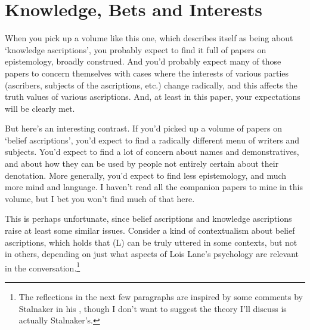 \providecommand{\objrep}[2]{
\bigskip
\noindent \textit{Objection}: #1

\medskip
\noindent \textit{Reply}: #2

}

\providecommand{\argconc}{
\renewcommand{\labelenumi}{\Alph{enumi}.}
\setcounter{enumi}{2}
}

\providecommand{\numbex}[2]{
\begin{enumerate}
\setcounter{enumi}{\value{paper}}
\renewcommand{\labelenumi}{(\arabic{enumi})}
#2
\end{enumerate}
\addtocounter{paper}{#1}}

\chapter[Knowledge, Bets and Interests]{Knowledge, Bets and Interests}


When you pick up a volume like this one, which describes itself as being about `knowledge ascriptions', you probably expect to find it full of papers on epistemology, broadly construed. And you'd probably expect many of those papers to concern themselves with cases where the interests of various parties (ascribers, subjects of the ascriptions, etc.) change radically, and this affects the truth values of various ascriptions. And, at least in this paper, your expectations will be clearly met.

But here's an interesting contrast. If you'd picked up a volume of papers on `belief ascriptions', you'd expect to find a radically different menu of writers and subjects. You'd expect to find a lot of concern about names and demonstratives, and about how they can be used by people not entirely certain about their denotation. More generally, you'd expect to find less epistemology, and much more mind and language. I haven't read all the companion papers to mine in this volume, but I bet you won't find much of that here.

This is perhaps unfortunate, since belief ascriptions and knowledge ascriptions raise at least some similar issues. Consider a kind of contextualism about belief ascriptions, which holds that (L) can be truly uttered in some contexts, but not in others, depending on just what aspects of Lois Lane's psychology are relevant in the conversation.\footnote{The reflections in the next few paragraphs are inspired by some comments by Stalnaker in his \citeyearpar{Stalnaker2008}, though I don't want to suggest the theory I'll discuss is actually Stalnaker's.}

